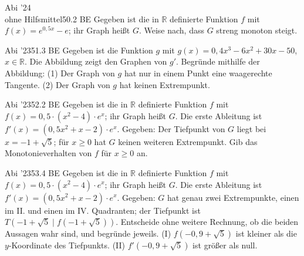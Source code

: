 \documentclass[11pt]{article}
\begin{document}
\pfgruppe{}
\begin{pfaufg}{Abi ’24\\ohne Hilfsmittel}{50.}{2 BE}
Gegeben ist die in $\mathbb{R}$ definierte Funktion $f$ mit $f(x) = e^{0{,}5x} - e$; ihr Graph heißt $G$. Weise nach, dass $G$ streng monoton steigt.
\end{pfaufg}
\begin{pfaufg}{Abi ’23}{51.}{3 BE}
Gegeben ist die Funktion $g$ mit $g(x) = 0{,}4x^3 - 6x^2 + 30x - 50$, $x \in \mathbb{R}$. Die Abbildung zeigt den Graphen von $g'$. Begründe mithilfe der Abbildung: (1) Der Graph von $g$ hat nur in einem Punkt eine waagerechte Tangente. (2) Der Graph von $g$ hat keinen Extrempunkt.
\par\smallskip\noindent {}\par
{}
\end{pfaufg}
\pfgruppe{}
\begin{pfaufg}{Abi ’23}{52.}{2 BE}
Gegeben ist die in $\mathbb{R}$ definierte Funktion $f$ mit $f(x) = 0{,}5\cdot(x^2 - 4)\cdot e^x$; ihr Graph heißt $G$. Die erste Ableitung ist $f'(x) = (0{,}5x^2 + x - 2)\cdot e^x$. Gegeben: Der Tiefpunkt von $G$ liegt bei $x = -1 + \sqrt{5}$; für $x \ge 0$ hat $G$ keinen weiteren Extrempunkt. Gib das Monotonieverhalten von $f$ für $x \ge 0$ an.
\fusshilfe{\mbox{52:~streng monoton fallend auf [0}}
\end{pfaufg}
\pfgruppe{}
\begin{pfaufg}{Abi ’23}{53.}{4 BE}
Gegeben ist die in $\mathbb{R}$ definierte Funktion $f$ mit $f(x) = 0{,}5\cdot(x^2 - 4)\cdot e^x$; ihr Graph heißt $G$. Die erste Ableitung ist $f'(x) = (0{,}5x^2 + x - 2)\cdot e^x$. Gegeben: $G$ hat genau zwei Extrempunkte, einen im II. und einen im IV. Quadranten; der Tiefpunkt ist $T(-1 + \sqrt{5} \mid f(-1 + \sqrt{5}))$. Entscheide ohne weitere Rechnung, ob die beiden Aussagen wahr sind, und begründe jeweils. (I) $f(-0{,}9 + \sqrt{5})$ ist kleiner als die $y$-Koordinate des Tiefpunkts. (II) $f'(-0{,}9 + \sqrt{5})$ ist größer als null.
\end{pfaufg}
\end{document}
